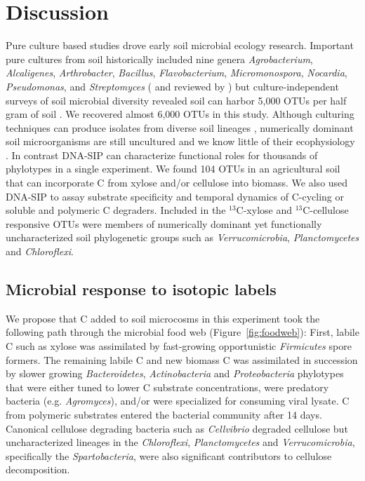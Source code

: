 \section{Discussion}
Pure culture based studies drove early soil microbial ecology research.
Important pure cultures from soil historically included nine genera
\textit{Agrobacterium}, \textit{Alcaligenes}, \textit{Arthrobacter},
\textit{Bacillus}, \textit{Flavobacterium}, \textit{Micromonospora},
\textit{Nocardia}, \textit{Pseudomonas}, and \textit{Streptomyces}
(\citep{Alexander1977} and reviewed by \citet{Janssen2006}) but
culture-independent surveys of soil microbial diversity revealed soil can
harbor 5,000 OTUs per half gram of soil \citep{Schloss2006}. We recovered almost 6,000
OTUs in this study. Although culturing techniques can produce isolates from
diverse soil lineages \citep{Janssen2002}, numerically dominant soil
microorganisms are still uncultured and we know little of their ecophysiology
\citep{Janssen2006}. In contrast DNA-SIP can characterize functional roles for
thousands of phylotypes in a single experiment. We found 104 OTUs in an
agricultural soil that can incorporate C from xylose and/or cellulose into
biomass. We also used DNA-SIP to assay substrate specificity
and temporal dynamics of C-cycling or soluble and polymeric C degraders.
Included in the $^{13}$C-xylose and $^{13}$C-cellulose responsive OTUs were
members of numerically dominant yet functionally uncharacterized soil
phylogenetic groups such as \textit{Verrucomicrobia}, \textit{Planctomycetes}
and \textit{Chloroflexi}.

\subsection{Microbial response to isotopic labels}
We propose that C added to soil microcosms in this experiment took the
following path through the microbial food web (Figure~\ref{fig:foodweb}):
First, labile C such as xylose was assimilated by fast-growing opportunistic
\textit{Firmicutes} spore formers. The remaining labile C and new biomass C was
assimilated in succession by slower growing \textit{Bacteroidetes},
\textit{Actinobacteria} and \textit{Proteobacteria} phylotypes that were either
tuned to lower C substrate concentrations, were predatory bacteria (e.g.
\textit{Agromyces}), and/or were specialized for consuming viral lysate. C from
polymeric substrates entered the bacterial community after 14 days. Canonical
cellulose degrading bacteria such as \textit{Cellvibrio} degraded cellulose
but uncharacterized lineages in the \textit{Chloroflexi},
\textit{Planctomycetes} and \textit{Verrucomicrobia}, specifically the
\textit{Spartobacteria}, were also significant contributors to cellulose
decomposition. 

